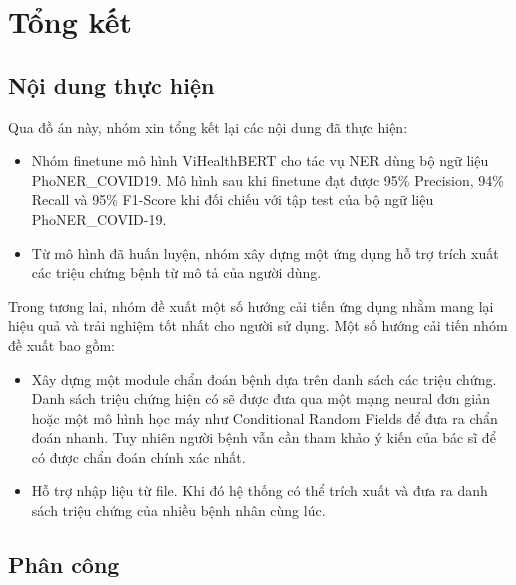 \section{Tổng kết}
\subsection{Nội dung thực hiện}
Qua đồ án này, nhóm xin tổng kết lại các nội dung đã thực hiện:
\begin{itemize}
\item Nhóm finetune mô hình ViHealthBERT cho tác vụ NER dùng bộ ngữ liệu PhoNER\_COVID19. Mô hình sau khi finetune đạt được 95\% Precision, 94\% Recall và 95\% F1-Score khi đối chiếu với tập test của bộ ngữ liệu PhoNER\_COVID-19.
\item Từ mô hình đã huấn luyện, nhóm xây dựng một ứng dụng hỗ trợ trích xuất các triệu chứng bệnh từ mô tả của người dùng.
\end{itemize}
Trong tương lai, nhóm đề xuất một số hướng cải tiến ứng dụng nhằm mang lại hiệu quả và trải nghiệm tốt nhất cho người sử dụng. Một số hướng cải tiến nhóm đề xuất bao gồm:
\begin{itemize}
\item Xây dựng một module chẩn đoán bệnh dựa trên danh sách các triệu chứng. Danh sách triệu chứng hiện có sẽ được đưa qua một mạng neural đơn giản hoặc một mô hình học máy như Conditional Random Fields để đưa ra chẩn đoán nhanh. Tuy nhiên người bệnh vẫn cần tham khảo ý kiến của bác sĩ để có được chẩn đoán chính xác nhất.
\item Hỗ trợ nhập liệu từ file. Khi đó hệ thống có thể trích xuất và đưa ra danh sách triệu chứng của nhiều bệnh nhân cùng lúc.
\end{itemize}

\subsection{Phân công}

